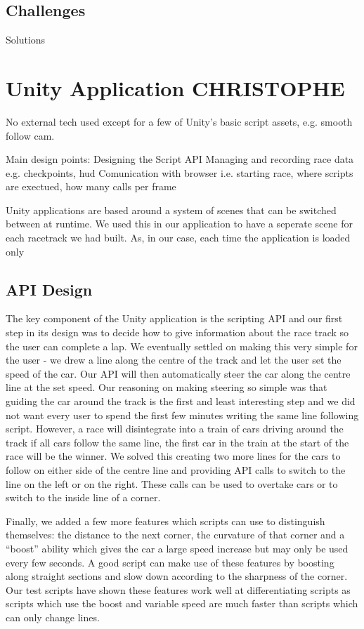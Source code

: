 \subsection{Challenges}
Solutions

\section{Unity Application {\color{blue} CHRISTOPHE}}
No external tech used except for a few of Unity's basic script assets, e.g. smooth follow cam.

Main design points:
Designing the Script API
Managing and recording race data e.g. checkpoints, hud
Comunication with browser i.e. starting race, where scripts are exectued, how many calls per frame

Unity applications are based around a system of scenes that can be switched between at runtime. We used this in our application to have a seperate scene for each racetrack we had built. As, in our case, each time the application is loaded only

\subsection{API Design}
The key component of the Unity application is the scripting API and our first step in its design was to decide how to give information about the race track so the user can complete a lap. We eventually settled on making this very simple for the user - we drew a line along the centre of the track and let the user set the speed of the car. Our API will then automatically steer the car along the centre line at the set speed. Our reasoning on making steering so simple was that guiding the car around the track is the first and least interesting step and we did not want every user to spend the first few minutes writing the same line following script. However, a race will disintegrate into a train of cars driving around the track if all cars follow the same line, the first car in the train at the start of the race will be the winner. We solved this creating two more lines for the cars to follow on either side of the centre line and providing API calls to switch to the line on the left or on the right. These calls can be used to overtake cars or to switch to the inside line of a corner.

Finally, we added a few more features which scripts can use to distinguish themselves: the distance to the next corner, the curvature of that corner and a ``boost'' ability which gives the car a large speed increase but may only be used every few seconds. A good script can make use of these features by boosting along straight sections and slow down according to the sharpness of the corner. Our test scripts have shown these features work well at differentiating scripts as scripts which use the boost and variable speed are much faster than scripts which can only change lines.

